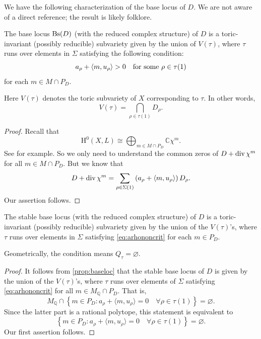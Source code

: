 We have the following characterization of the base locus of $D$. We are not aware of a direct reference; the result is likely folklore.
\begin{proposition}\label{prop:baseloc}
    The base locus $\operatorname{Bs}(D)$ (with the reduced complex structure) of $D$ is a toric-invariant (possibly reducible) subvariety given by the union of $V(\tau)$, where $\tau$ runs over elements in $\Sigma$ satisfying the following condition:
    \begin{equation}\label{eq:arhononcrit}
        a_{\rho}+\langle m, u_{\rho}\rangle>0\quad \textup{for some }\rho\in \tau(1)
    \end{equation}
    for each $m\in M\cap P_D$.
\end{proposition}
Here $V(\tau)$ denotes the toric subvariety of $X$ corresponding to $\tau$. In other words,
\[
V(\tau)=\bigcap_{\rho\in \tau(1)} D_{\rho}.
\]
\begin{proof}
    Recall that
    \[
    \mathrm{H}^0(X,L)\cong \bigoplus_{m\in M\cap P_D} \mathbb{C}\chi^m.
    \]
    See \cite[Proposition~4.3.3]{CLS11} for example. So we only need to understand the common zeros of $D+\operatorname{div} \chi^m$ for all $m\in M\cap P_D$. But we know that
    \[
    D+\operatorname{div} \chi^m=\sum_{\rho\in \Sigma(1)} \left( a_{\rho}+\langle m, u_{\rho}\rangle \right) D_{\rho}.
    \]
    Our assertion follows.
\end{proof}

\begin{corollary}\label{cor:stablebl_toric}
    The stable base locus (with the reduced complex structure) of $D$ is a toric-invariant (possibly reducible) subvariety given by the union of the $V(\tau)$'s,  where $\tau$ runs over elements in $\Sigma$ satisfying \eqref{eq:arhononcrit} for each $m\in P_D$.
\end{corollary}
Geometrically, the condition means $Q_{\tau}=\varnothing$.
\begin{proof}
    It follows from \cref{prop:baseloc} that the stable base locus of $D$ is given by the union of the $V(\tau)$'s, where $\tau$ runs over elements of $\Sigma$ satisfying \eqref{eq:arhononcrit} for all $m\in M_{\mathbb{Q}}\cap P_D$. That is,
    \[
        M_{\mathbb{Q}}\cap \left\{ m\in P_D : a_{\rho}+\langle m, u_{\rho}\rangle=0\quad \forall \rho\in \tau(1) \right\}=\varnothing.
    \]
    Since the latter part is a rational polytope, this statement is equivalent to
    \begin{equation}\label{eq:PDcapvarnot}
    \left\{ m\in P_D : a_{\rho}+\langle m, u_{\rho}\rangle=0\quad \forall \rho\in \tau(1) \right\}=\varnothing.
    \end{equation}
    Our first assertion follows.
\end{proof}



